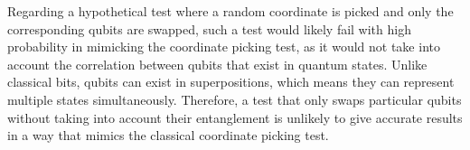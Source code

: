 Regarding a hypothetical test where a random coordinate is picked and only the corresponding qubits are swapped, such a test would likely fail with high probability in mimicking the coordinate picking test, as it would not take into account the correlation between qubits that exist in quantum states. Unlike classical bits, qubits can exist in superpositions, which means they can represent multiple states simultaneously. Therefore, a test that only swaps particular qubits without taking into account their entanglement is unlikely to give accurate results in a way that mimics the classical coordinate picking test.



